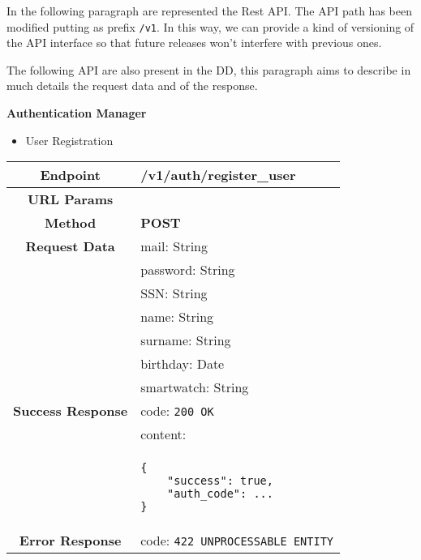 In the following paragraph are represented the Rest API.
The API path has been modified putting as prefix \texttt{/v1}. In this way, we can provide a kind of versioning of the API interface so that future releases won't interfere with previous ones.

The following API are also present in the DD, this paragraph aims to describe in much details the request data and of the response.


    \textbf{Authentication Manager}
    \begin{itemize}
        \item User Registration
    \end{itemize}
    \begin{adjustwidth}{1cm}{}
        \begin{longtable}{|c|l|}
            \hline
            \textbf{Endpoint} & /v1/auth/register\_user \\
            \hline
            \textbf{URL Params} &  \\
            \hline
            \textbf{Method} & \textbf{POST} \\
            \hline
            \textbf{Request Data} & mail: String \\
            &                 password: String \\
            &                 SSN: String \\
            &                 name: String \\
            &                 surname: String \\
            &                 birthday: Date \\
            &                 smartwatch: String \\
            \hline
            \textbf{Success Response} & code: \texttt{200 OK} \\
            &                           content: \\
            & \begin{minipage}[t]{0.5\textwidth}
                \begin{adjustwidth}{1.5cm}{}
                \begin{verbatim}
{
    "success": true, 
    "auth_code": ...
}
                \end{verbatim}
                \end{adjustwidth}
              \end{minipage} \\
              \hline
            \textbf{Error Response} & code: \texttt{422 UNPROCESSABLE ENTITY} \\

\end{longtable}
\end{adjustwidth}
